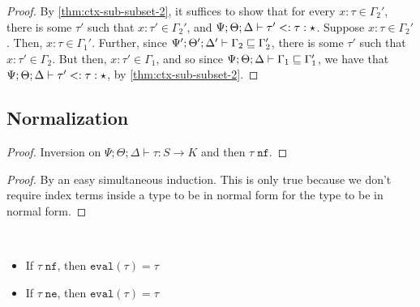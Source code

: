 \ctxsubswap*
\begin{proof}
By \autoref{thm:ctx-sub-subset-2}, it suffices to show that for every $x : \tau \in \Gamma_2'$, there is some $\tau'$ such that $x : \tau' \in \Gamma_2'$,
and $\Psi ; \Theta ; \Delta \vdash \tau' <: \tau : \star$. Suppose $x : \tau \in \Gamma_2'$. Then, $x : \tau \in \Gamma_1'$. Further, since $\Psi' ; \Theta' ;  \Delta' \vdash \Gamma_2 \sqsubseteq \Gamma_2'$, there is some $\tau'$ such that $x : \tau' \in \Gamma_2$. But then, $x : \tau' \in \Gamma_1$, and so since  $\Psi ; \Theta ; \Delta \vdash \Gamma_1 \sqsubseteq \Gamma_1'$, we have that $\Psi ; \Theta ; \Delta \vdash \tau' <: \tau : \star$, by \autoref{thm:ctx-sub-subset-2}.
\end{proof}

\subsection{Normalization}

\canonforms*
\begin{proof}
Inversion on $\Psi ;\Theta ; \Delta \vdash \tau : S \to K$  and then $\tau \; \texttt{nf}$.
\end{proof}

\idxsubstnf*
\begin{proof}
By an easy simultaneous induction. This is only true because we don't require index terms inside a type to be in normal form for the type to be in normal form.
\end{proof}

\idxsubsteval*


\normthm*

\begin{theorem}
~\begin{itemize}
  \item If $\tau \; \texttt{nf}$, then $\texttt{eval}(\tau) = \tau$
  \item If $\tau \; \texttt{ne}$, then $\texttt{eval}(\tau) = \tau$
\end{itemize}
\label{thm:norm-idemp}
\end{theorem}




